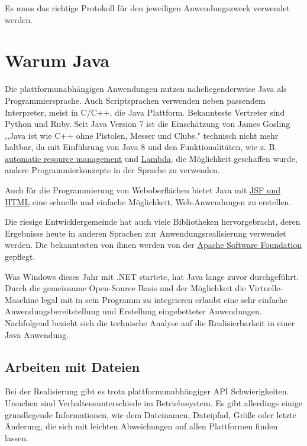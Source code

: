 \documentclass[oneside, ngerman, toc=bibliography,bibliography=totoc,listof=entryprefix, open=right,numbers=noenddot,fontsize=12pt]{scrbook}
\begin{document}
Es muss das richtige Protokoll für den jeweiligen Anwendungszweck verwendet werden.

\section{Warum Java}
Die plattformunabhängigen Anwendungen nutzen naheliegenderweise Java als Programmiersprache. Auch Scriptsprachen verwenden neben passendem Interpreter, meist in C/C++, die Java Plattform. Bekannteste Vertreter sind Python und Ruby.
Seit Java Version 7 ist die Einschätzung von James Gosling ,,Java ist wie C++ ohne Pistolen, Messer und Clubs." technisch nicht mehr haltbar, da mit Einführung von Java 8 und den Funktionalitäten, wie z. B.  \href{http://www.oracle.com/technetwork/articles/java/trywithresources-401775.html}{automatic resource management} und \href{http://www.oracle.com/technetwork/articles/java/rich-client-lambdas-2227138.html}{Lambda}, die Möglichkeit geschaffen wurde, andere Programmierkonzepte in der Sprache zu verwenden.

Auch für die Programmierung von Weboberflächen bietet Java mit \href{http://www.oracle.com/technetwork/articles/java/enterprise-html5-2227136.html}{JSF und HTML} eine schnelle und einfache Möglichkeit, Web-Anwendungen zu erstellen.

Die riesige Entwicklergemeinde hat auch viele Bibliotheken hervorgebracht, deren Ergebnisse heute in anderen Sprachen zur Anwendungsrealisierung verwendet werden. Die bekanntesten von ihnen werden von der
\href{http://www.apache.org/}{ Apache Software Foundation } gepflegt.


Was Windows dieses Jahr mit {.NET} startete, hat Java lange zuvor durchgeführt. Durch die gemeinsame Open-Source Basis und der Möglichkeit die Virtuelle-Maschine legal mit in sein Programm zu integrieren erlaubt eine sehr einfache Anwendungsbereitstellung und Erstellung eingebetteter Anwendungen. Nachfolgend bezieht sich die technische Analyse auf die Realisierbarkeit in einer Java Anwendung.


\subsection{Arbeiten mit Dateien}
Bei der Realisierung gibt es trotz plattformunabhängiger API Schwierigkeiten. Ursachen sind Verhaltensunterschiede im Betriebssystem.
Es gibt allerdings einige grundlegende Informationen, wie dem Dateinamen, Dateipfad, Größe oder letzte Änderung, die sich mit leichten Abweichungen auf allen Plattformen finden lassen.
\end{document}
